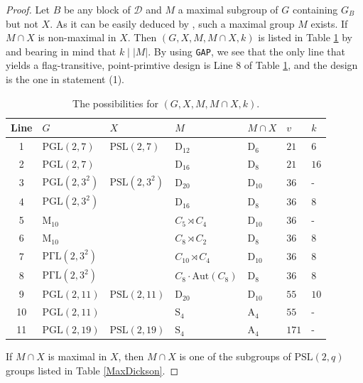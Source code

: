 \documentclass[a4paper,twopage,reqno,12pt]{amsart}
\theoremstyle{definition}
\numberwithin{equation}{section}
\newcommand{\PSL}{\mathrm{PSL}}
\newcommand{\PGaL}{\mathrm{P\Gamma L}}
\newcommand{\Aut}{\mathrm{Aut}}
\begin{document}
\begin{proof}
Let $B$ be any block of $\mathcal{D}$ and $M$ a maximal subgroup of $G$ containing $G_{B}$ but not $X$. As it can be easily deduced by \cite[Tables 8.2--8.3]{BHRD}, such a maximal group $M$ exists. If $M\cap X$ is non-maximal in $X$. Then $(G,X,M,M\cap X,k)$ is listed in Table \ref{Tab:Giudici} by \cite[Theorem 1.1]{gmaxi} and bearing in mind that $k \mid \left\vert M \right \vert$. By using \texttt{GAP}, we see that the only line that yields a flag-transitive, point-primtive design is Line 8 of Table \ref{Tab:Giudici}, and the design is the one in statement (1). %
\begin{table}[h!]
\footnotesize
\caption{The possibilities for $(G,X,M,M\cap X,k)$.}
\label{Tab:Giudici}
\tiny
\begin{tabular}{cllllll}
\toprule
Line & $G$ & $X$ & $M$ & $M\cap X$ & $v$ & $k$ \\
\midrule
1 & $\mathrm{PGL}(2,7)$         & $\mathrm{PSL}(2,7)$          & $\mathrm{D_{12}}$               &  $\mathrm{D_{6}}$ & $21$  & $6$\\  
2 & $\mathrm{PGL}(2,7)$         &                              & $\mathrm{D_{16}}$               &  $\mathrm{D_{8}}$ &  $21$ & $16$\\  
3 & $\mathrm{PGL}(2,3^{2})$         &  $\mathrm{PSL}(2,3^{2})$         & $\mathrm{D_{20}}$               &  $\mathrm{D_{10}}$ & $36$ & -\\  
4 & $\mathrm{PGL}(2,3^{2})$         &                              & $\mathrm{D_{16}}$               &  $\mathrm{D_{8}}$ & $36$ & $8$\\  
5 & $\mathrm{M_{10}}$           &                              & $C_{5}\rtimes C_4$              &  $\mathrm{D_{10}}$ & $36$ & -\\  
6 & $\mathrm{M_{10}}$           &                              & $C_{8}\rtimes C_{2}$            &  $\mathrm{D_{8}}$&  $36$ & $8$\\   
7 & $\mathrm{\PGaL}(2,3^{2})$   &                              & $C_{10}\rtimes C_{4}$           &  $\mathrm{D_{10}}$ & $36$ & $8$\\   
8 & $\mathrm{\PGaL}(2,3^{2})$   &                              & $C_{8}\cdot \Aut(C_8)$           &  $\mathrm{D_{8}}$ & $36$ & $8$\\ 
9 & $\mathrm{PGL}(2,11)$        &  $\mathrm{PSL}(2,11)$        & $\mathrm{D_{20}}$               &  $\mathrm{D_{10}}$ & $55$ &$10$\\
10 & $\mathrm{PGL}(2,11)$       &                              & $\mathrm{S_{4}}$                &  $\mathrm{A_{4}}$ & $55$ & -\\
11& $\mathrm{PGL}(2,19)$        &  $\mathrm{PSL}(2,19)$        & $\mathrm{S_{4}}$                &  $\mathrm{A_{4}}$ & $171$& -\\
\bottomrule
\end{tabular}
\end{table}
If $M\cap X$ is maximal in $X$, then $M\cap X$ is one of the subgroups of $\PSL(2,q)$ groups listed in Table \ref{MaxDickson}.
\end{proof}
\end{document}
